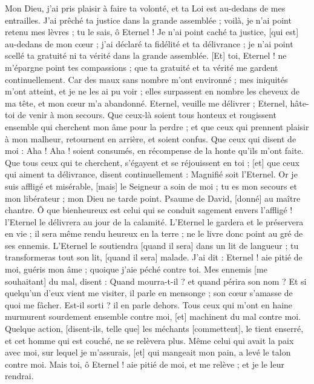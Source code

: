 \begin{multicols}{2}
Mon Dieu, j'ai pris plaisir à faire ta volonté, et ta Loi est au-dedans de mes entrailles.
J'ai prêché ta justice dans la grande assemblée ; voilà, je n'ai point retenu mes lèvres ; tu le sais, ô Eternel !
Je n'ai point caché ta justice, [qui est] au-dedans de mon cœur ; j'ai déclaré ta fidélité et ta délivrance ; je n'ai point scellé ta gratuité ni ta vérité dans la grande assemblée.
[Et] toi, Eternel ! ne m'épargne point tes compassions ; que ta gratuité et ta vérité me gardent continuellement.
Car des maux sans nombre m'ont environné ; mes iniquités m'ont atteint, et je ne les ai pu voir ; elles surpassent en nombre les cheveux de ma tête, et mon cœur m'a abandonné.
Eternel, veuille me délivrer ; Eternel, hâte-toi de venir à mon secours.
Que ceux-là soient tous honteux et rougissent ensemble qui cherchent mon âme pour la perdre ; et que ceux qui prennent plaisir à mon malheur, retournent en arrière, et soient confus.
Que ceux qui disent de moi : Aha ! Aha ! soient consumés, en récompense de la honte qu'ils m'ont faite.
Que tous ceux qui te cherchent, s'égayent et se réjouissent en toi ; [et] que ceux qui aiment ta délivrance, disent continuellement : Magnifié soit l'Eternel.
Or je suis affligé et misérable, [mais] le Seigneur a soin de moi ; tu es mon secours et mon libérateur ; mon Dieu ne tarde point.
\VerseOne{}Psaume de David, [donné] au maître chantre. Ô que bienheureux est celui qui se conduit sagement envers l'affligé ! l'Eternel le délivrera au jour de la calamité.
L'Eternel le gardera et le préservera en vie ; il sera même rendu heureux en la terre ; ne le livre donc point au gré de ses ennemis.
L'Eternel le soutiendra [quand il sera] dans un lit de langueur ; tu transformeras tout son lit, [quand il sera] malade.
J'ai dit : Eternel ! aie pitié de moi, guéris mon âme ; quoique j'aie péché contre toi.
Mes ennemis [me souhaitant] du mal, disent : Quand mourra-t-il ? et quand périra son nom ?
Et si quelqu'un d'eux vient me visiter, il parle en mensonge ; son cœur s'amasse de quoi me fâcher. Est-il sorti ? il en parle dehors.
Tous ceux qui m'ont en haine murmurent sourdement ensemble contre moi, [et] machinent du mal contre moi.
Quelque action, [disent-ils, telle que] les méchants [commettent], le tient enserré, et cet homme qui est couché, ne se relèvera plus.
Même celui qui avait la paix avec moi, sur lequel je m'assurais, [et] qui mangeait mon pain, a levé le talon contre moi.
Mais toi, ô Eternel ! aie pitié de moi, et me relève ; et je le leur rendrai.

\end{multicols}

